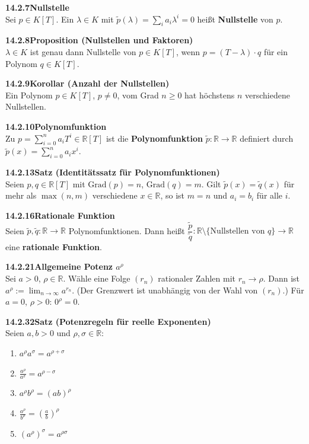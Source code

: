 \documentclass[a4paper,12pt]{article}
\newcommand{\gentry}[3]{%
  \noindent\textbf{#1\quad #2}\nopagebreak\\[0.2em]
  #3\par\smallskip
}
\begin{document}
\gentry{14.2.7}{Nullstelle}{%
  Sei $p \in K[T]$. Ein $\lambda \in K$ mit $\tilde{p}(\lambda) = \sum_i a_i \lambda^i = 0$
  heißt \textbf{Nullstelle} von $p$.
}

\gentry{14.2.8}{Proposition (Nullstellen und Faktoren)}{%
  $\lambda \in K$ ist genau dann Nullstelle von $p \in K[T]$, wenn
  $p = (T - \lambda) \cdot q$ für ein Polynom $q \in K[T]$.
}

\gentry{14.2.9}{Korollar (Anzahl der Nullstellen)}{%
  Ein Polynom $p \in K[T]$, $p \neq 0$, vom Grad $n \ge 0$ hat höchstens $n$
  verschiedene Nullstellen.
}

\gentry{14.2.10}{Polynomfunktion}{%
  Zu $p = \sum_{i=0}^n a_i T^i \in \mathbb{R}[T]$ ist die \textbf{Polynomfunktion}
  $\tilde{p}: \mathbb{R} \to \mathbb{R}$ definiert durch
  $\tilde{p}(x) = \sum_{i=0}^n a_i x^i$.
}

\gentry{14.2.13}{Satz (Identitätssatz für Polynomfunktionen)}{%
  Seien $p, q \in \mathbb{R}[T]$ mit $\mathrm{Grad}(p) = n$, $\mathrm{Grad}(q) = m$.
  Gilt $\tilde{p}(x) = \tilde{q}(x)$ für mehr als $\max(n, m)$ verschiedene $x \in \mathbb{R}$,
  so ist $m = n$ und $a_i = b_i$ für alle $i$.
}

\gentry{14.2.16}{Rationale Funktion}{%
  Seien $\tilde{p}, \tilde{q}: \mathbb{R} \to \mathbb{R}$ Polynomfunktionen. Dann heißt
  $\dfrac{\tilde{p}}{\tilde{q}}: \mathbb{R} \setminus \{\text{Nullstellen von } q\} \to \mathbb{R}$
  eine \textbf{rationale Funktion}.
}

\gentry{14.2.21}{Allgemeine Potenz $a^\rho$}{%
  Sei $a > 0$, $\rho \in \mathbb{R}$. Wähle eine Folge $(r_n)$ rationaler Zahlen mit
  $r_n \to \rho$. Dann ist $a^\rho := \lim_{n \to \infty} a^{r_n}$.
  (Der Grenzwert ist unabhängig von der Wahl von $(r_n)$.)
  Für $a = 0$, $\rho > 0$: $0^\rho = 0$.
}

\gentry{14.2.32}{Satz (Potenzregeln für reelle Exponenten)}{%
  Seien $a, b > 0$ und $\rho, \sigma \in \mathbb{R}$:
  \begin{enumerate}[label=\arabic*.,topsep=2pt,itemsep=1pt]
    \item $a^\rho a^\sigma = a^{\rho+\sigma}$
    \item $\frac{a^\rho}{a^\sigma} = a^{\rho-\sigma}$
    \item $a^\rho b^\rho = (ab)^\rho$
    \item $\frac{a^\rho}{b^\rho} = \left(\frac{a}{b}\right)^\rho$
    \item $(a^\rho)^\sigma = a^{\rho\sigma}$
  \end{enumerate}
}
\end{document}

